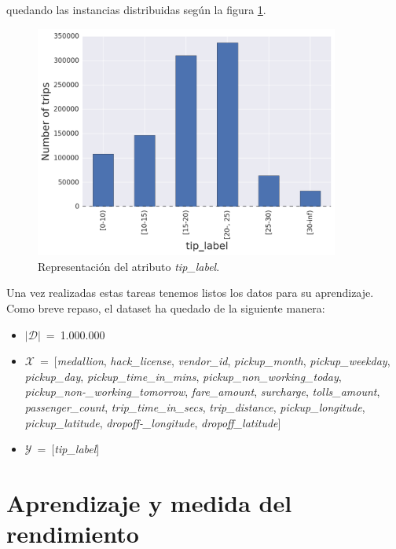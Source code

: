 \noindent

quedando las instancias distribuidas según la figura \ref{fig:5.12}.

\begin{figure}[ht]
  \centering
  \includegraphics[width=100mm]{figures/ch_05/tip_label_1.png}
  \caption{Representación del atributo \emph{tip\_label}.}
  \label{fig:5.12}
\end{figure}

\pagebreak

Una vez realizadas estas tareas tenemos listos los datos para su aprendizaje. Como breve repaso, el dataset ha quedado de la siguiente manera:

\vspace*{-5mm}

\begin{itemize}
\item[\textbullet]$|\mathcal{D}|\:=\:$1.000.000

\item[\textbullet]$\mathcal{X}\:=\:[$\emph{medallion}, \emph{hack\_license}, \emph{vendor\_id}, \emph{pickup\_month}, \emph{pickup\_weekday}, \emph{pickup\_day}, \emph{pickup\_time\_in\_mins}, \emph{pickup\_non\_working\_today}, \emph{pickup\_non-\_working\_tomorrow}, \emph{fare\_amount}, \emph{surcharge}, \emph{tolls\_amount}, \emph{passenger\_count}, \emph{trip\_time\_in\_secs}, \emph{trip\_distance}, \emph{pickup\_longitude}, \emph{pickup\_latitude}, \emph{dropoff-\_longitude}, \emph{dropoff\_latitude}$]$

\item[\textbullet]$\mathcal{Y}\:=\:[$\emph{tip\_label}$]$
\end{itemize}

\vspace*{5mm}

\section{Aprendizaje y medida del rendimiento} \label{sec:5.3}

